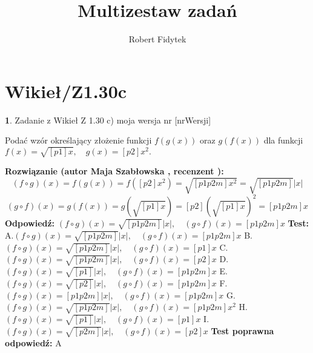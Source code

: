 \documentclass[12pt, a4paper]{article}
\title{Multizestaw zadań}
\author{Robert Fidytek}
\date{}
\theoremstyle{definition} %
\newtheorem{zad}{}
\newcommand{\kategoria}[1]{\section{#1}} %
\newcommand{\zadStart}[1]{\begin{zad}#1\newline} %
\newcommand{\zadStop}{\end{zad}}   %
\newcommand{\rozwStart}[2]{\noindent \textbf{Rozwiązanie (autor #1 , recenzent #2): }\newline} %
\newcommand{\rozwStop}{\newline}                                            %
\newcommand{\odpStart}{\noindent \textbf{Odpowiedź:}\newline}    %
\newcommand{\odpStop}{\newline}                                             %
\newcommand{\testStart}{\noindent \textbf{Test:}\newline} %
\newcommand{\testStop}{\newline} %
\newcommand{\kluczStart}{\noindent \textbf{Test poprawna odpowiedź:}\newline} %
\newcommand{\kluczStop}{\newline} %
\begin{document}
\maketitle


\kategoria{Wikieł/Z1.30c}
\zadStart{Zadanie z Wikieł Z 1.30 c)  moja wersja nr [nrWersji]}


Podać wzór określający złożenie funkcji $f(g(x))$ oraz $g(f(x))$ dla funkcji $f(x)=\sqrt{[p1]x},\quad g(x)=[p2]x^{2}.$
\zadStop
\rozwStart{Maja Szabłowska}{}
$$(f\circ g)(x)=f(g(x))=f([p2]x^{2})=\sqrt{[p1p2m]x^{2}}=\sqrt{[p1p2m]}|x|$$
$$(g\circ f)(x)=g(f(x))=g(\sqrt{[p1]x})=[p2](\sqrt{[p1]x})^{2}=[p1p2m]x$$
\rozwStop
\odpStart
$(f\circ g)(x)=\sqrt{[p1p2m]}|x|, \quad (g\circ f)(x)=[p1p2m]x$
\odpStop
\testStart
A.$(f\circ g)(x)=\sqrt{[p1p2m]}|x|, \quad (g\circ f)(x)=[p1p2m]x$
B.$(f\circ g)(x)=\sqrt{[p1p2m]}|x|, \quad (g\circ f)(x)=[p1]x$
C.$(f\circ g)(x)=\sqrt{[p1p2m]}|x|, \quad (g\circ f)(x)=[p2]x$
D.$(f\circ g)(x)=\sqrt{[p1]}|x|, \quad (g\circ f)(x)=[p1p2m]x$
E.$(f\circ g)(x)=\sqrt{[p2]}|x|, \quad (g\circ f)(x)=[p1p2m]x$
F.$(f\circ g)(x)=[p1p2m]|x|, \quad (g\circ f)(x)=[p1p2m]x$
G.$(f\circ g)(x)=\sqrt{[p1p2m]}|x|, \quad (g\circ f)(x)=[p1p2m]x^{2}$
H.$(f\circ g)(x)=\sqrt{[p1]}|x|, \quad (g\circ f)(x)=[p1]x$
I.$(f\circ g)(x)=\sqrt{[p2m]}|x|, \quad (g\circ f)(x)=[p2]x$
\testStop
\kluczStart
A
\kluczStop
\end{document}

